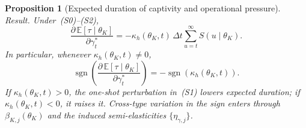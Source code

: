 \documentclass[ecta,nameyear,final,supplement]{econsocart}
\numberwithin{equation}{section}
\numberwithin{table}{section}
\newtheorem{proposition}[theorem]{Proposition}
\theoremstyle{definition}
\begin{document}
\begin{proposition}[Expected duration of captivity and operational pressure]
\medskip
\noindent\textit{Result.}
Under~\textup{(S0)--(S2)},
\begin{equation}
\label{eq:dE-dgamma-prop}
\frac{\partial\,\mathbb{E}[\tau\mid\theta_K]}{\partial\gamma_t^\ast}
=-\kappa_h(\theta_K,t)\,\Delta t\sum_{u=t}^{\infty}S(u\mid\theta_K).
\end{equation}
In particular, whenever $\kappa_h(\theta_K,t)\neq 0$,
\begin{equation}
\operatorname{sgn}\!\left(
  \frac{\partial\,\mathbb{E}[\tau\mid\theta_K]}{\partial\gamma_t^\ast}
\right)
=-\operatorname{sgn}\!\left(\kappa_h(\theta_K,t)\right).
\end{equation}
If $\kappa_h(\theta_K,t)>0$, the one-shot perturbation in~\textup{(S1)} lowers
expected duration; if $\kappa_h(\theta_K,t)<0$, it raises it. Cross-type
variation in the sign enters through $\beta_{K,j}(\theta_K)$ and the induced
semi-elasticities $\{\eta_{\gamma,j}\}$.
\end{proposition}
\end{document}
